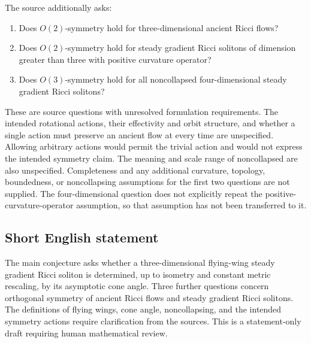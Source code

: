 \documentclass[11pt]{article}
\begin{document}
The source additionally asks:
\begin{enumerate}
\item Does $O(2)$-symmetry hold for three-dimensional ancient Ricci flows?
\item Does $O(2)$-symmetry hold for steady gradient Ricci solitons of dimension greater than three with positive curvature operator?
\item Does $O(3)$-symmetry hold for all noncollapsed four-dimensional steady gradient Ricci solitons?
\end{enumerate}
These are source questions with unresolved formulation requirements. The intended rotational actions, their effectivity and orbit structure, and whether a single action must preserve an ancient flow at every time are unspecified. Allowing arbitrary actions would permit the trivial action and would not express the intended symmetry claim. The meaning and scale range of noncollapsed are also unspecified. Completeness and any additional curvature, topology, boundedness, or noncollapsing assumptions for the first two questions are not supplied. The four-dimensional question does not explicitly repeat the positive-curvature-operator assumption, so that assumption has not been transferred to it.
\subsection{Short English statement}
The main conjecture asks whether a three-dimensional flying-wing steady gradient Ricci soliton is determined, up to isometry and constant metric rescaling, by its asymptotic cone angle. Three further questions concern orthogonal symmetry of ancient Ricci flows and steady gradient Ricci solitons. The definitions of flying wings, cone angle, noncollapsing, and the intended symmetry actions require clarification from the sources. This is a statement-only draft requiring human mathematical review.
\end{document}
